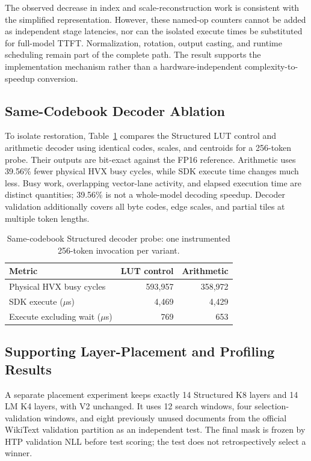 \documentclass[conference,a4paper,10pt]{IEEEtran}
\begin{document}
The observed decrease in index and scale-reconstruction work is consistent with the simplified representation. However, these named-op counters cannot be added as independent stage latencies, nor can the isolated execute times be substituted for full-model TTFT. Normalization, rotation, output casting, and runtime scheduling remain part of the complete path. The result supports the implementation mechanism rather than a hardware-independent complexity-to-speedup conversion.

\subsection{Same-Codebook Decoder Ablation}
To isolate restoration, Table~\ref{tab:decoder} compares the Structured LUT control and arithmetic decoder using identical codes, scales, and centroids for a 256-token probe. Their outputs are bit-exact against the FP16 reference. Arithmetic uses 39.56\% fewer physical HVX busy cycles, while SDK execute time changes much less. Busy work, overlapping vector-lane activity, and elapsed execution time are distinct quantities; 39.56\% is not a whole-model decoding speedup. Decoder validation additionally covers all byte codes, edge scales, and partial tiles at multiple token lengths.

\begin{table}[t]
\caption{Same-codebook Structured decoder probe: one instrumented 256-token invocation per variant.}
\label{tab:decoder}
\centering
\setlength{\tabcolsep}{5pt}
\begin{tabular}{@{}lrr@{}}
\toprule
Metric & LUT control & Arithmetic\\
\midrule
Physical HVX busy cycles & 593,957 & 358,972\\
SDK execute ($\mu$s) & 4,469 & 4,429\\
Execute excluding wait ($\mu$s) & 769 & 653\\
\bottomrule
\end{tabular}
\end{table}

\subsection{Supporting Layer-Placement and Profiling Results}
A separate placement experiment keeps exactly 14 Structured K8 layers and 14 LM K4 layers, with V2 unchanged. It uses 12 search windows, four selection-validation windows, and eight previously unused documents from the official WikiText validation partition as an independent test. The final mask is frozen by HTP validation NLL before test scoring; the test does not retrospectively select a winner.
\end{document}
